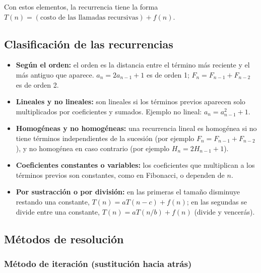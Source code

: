 \documentclass{article}
\begin{document}
        Con estos elementos, la recurrencia tiene la forma
        $T(n) = (\text{costo de las llamadas recursivas}) + f(n)$.
        
        \subsection{Clasificación de las recurrencias}
        
        \begin{itemize}
        \item \textbf{Según el orden:} el orden es la distancia entre el término
                más reciente y el más antiguo que aparece. $a_n = 2a_{n-1}+1$ es de
                orden 1; $F_n = F_{n-1}+F_{n-2}$ es de orden 2.
        \item \textbf{Lineales y no lineales:} son lineales si los términos previos
                aparecen solo multiplicados por coeficientes y sumados. Ejemplo no
                lineal: $a_n = a_{n-1}^2 + 1$.
        \item \textbf{Homogéneas y no homogéneas:} una recurrencia lineal es
                homogénea si no tiene términos independientes de la sucesión (por
                ejemplo $F_n = F_{n-1} + F_{n-2}$), y no homogénea en caso contrario
                (por ejemplo $H_n = 2H_{n-1} + 1$).
        \item \textbf{Coeficientes constantes o variables:} los coeficientes que
                multiplican a los términos previos son constantes, como en Fibonacci,
                o dependen de $n$.
        \item \textbf{Por sustracción o por división:} en las primeras el tamaño
                disminuye restando una constante, $T(n) = aT(n-c) + f(n)$; en las
                segundas se divide entre una constante, $T(n) = aT(n/b) + f(n)$
                (divide y vencerás).
        \end{itemize}
        
        \subsection{Métodos de resolución}
        
        \subsubsection{Método de iteración (sustitución hacia atrás)}
        
\end{document}
